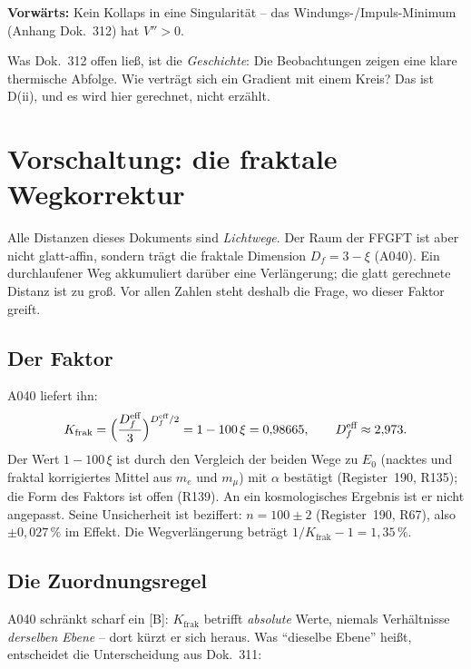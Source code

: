 \textbf{Vorwärts:} Kein Kollaps in eine Singularität -- das
Windungs-/Impuls-Minimum (Anhang Dok.~312) hat $V'' > 0$.

Was Dok.~312 offen ließ, ist die \emph{Geschichte}: Die
Beobachtungen zeigen eine klare thermische Abfolge. Wie verträgt
sich ein Gradient mit einem Kreis? Das ist D(ii), und es wird hier
gerechnet, nicht erzählt.

\chapter{Vorschaltung: die fraktale Wegkorrektur}

Alle Distanzen dieses Dokuments sind \emph{Lichtwege}. Der Raum
der FFGFT ist aber nicht glatt-affin, sondern trägt die fraktale
Dimension $D_f = 3-\xi$ (A040). Ein durchlaufener Weg akkumuliert
darüber eine Verlängerung; die glatt gerechnete Distanz ist zu
groß. Vor allen Zahlen steht deshalb die Frage, wo dieser Faktor
greift.

\section{Der Faktor}

A040 liefert ihn:
\begin{equation}
  K_\text{frak} = \Bigl(\frac{D_f^\text{eff}}{3}\Bigr)^{D_f^\text{eff}/2}
  = 1-100\,\xi = 0{,}98665,
  \qquad D_f^\text{eff} \approx 2{,}973 .
\end{equation}
Der Wert $1-100\,\xi$ ist durch den Vergleich der beiden Wege zu
$E_0$ (nacktes und fraktal korrigiertes Mittel aus $m_e$ und
$m_\mu$) mit $\alpha$ bestätigt (Register~190, R135); die Form des
Faktors ist offen (R139). An ein kosmologisches Ergebnis ist er
nicht angepasst. Seine Unsicherheit ist beziffert: $n = 100 \pm 2$ (Register~190, R67),
also $\pm 0{,}027\,\%$ im Effekt. Die Wegverlängerung beträgt
$1/K_\text{frak} - 1 = 1{,}35\,\%$.

\section{Die Zuordnungsregel}

A040 schränkt scharf ein [B]: $K_\text{frak}$ betrifft
\emph{absolute} Werte, niemals Verhältnisse \emph{derselben
Ebene} -- dort kürzt er sich heraus. Was \enquote{dieselbe Ebene}
heißt, entscheidet die Unterscheidung aus Dok.~311:

